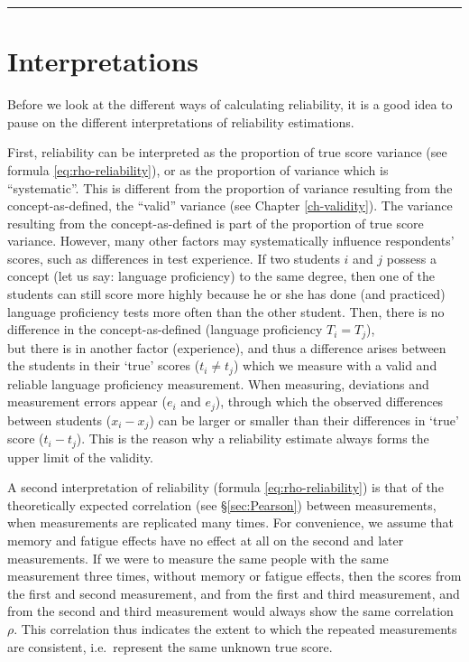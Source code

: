 \documentclass[
]{book}
\begin{document}
\begin{center}\rule{0.5\linewidth}{0.5pt}\end{center}

\hypertarget{interpretations}{%
\section{Interpretations}\label{interpretations}}

Before we look at the different ways of calculating
reliability, it is a good idea to pause on the different
interpretations of reliability estimations.

First, reliability can be interpreted as the proportion of
true score variance (see formula \eqref{eq:rho-reliability}), or
as the proportion of variance which is ``systematic''.
This is different from the proportion of variance resulting from the concept-as-defined,
the ``valid'' variance (see Chapter \ref{ch-validity}).
The variance resulting from the concept-as-defined is part of the proportion of
true score variance.
However, many other factors may systematically influence
respondents' scores, such as differences in test experience. If two students \(i\) and \(j\)
possess a concept (let us say: language proficiency) to the same degree, then one of the
students can still score more highly because he or she has done (and practiced) language proficiency
tests more often than the other student. Then, there is no difference
in the concept-as-defined (language proficiency \(T_i = T_j\)),\\
but there is in another factor (experience), and thus a difference arises
between the students in their `true' scores (\(t_i \neq t_j\)) which
we measure with a valid and reliable language proficiency measurement. When measuring,
deviations and measurement errors appear (\(e_i\) and \(e_j\)), through which
the observed differences between students (\(x_i-x_j\)) can be larger or smaller than their
differences in `true' score (\(t_i-t_j\)).
This is the reason why a reliability estimate always forms the upper limit of
the validity.

A second interpretation of reliability (formula \eqref{eq:rho-reliability})
is that of the theoretically expected correlation (see
§\ref{sec:Pearson}) between measurements, when measurements are replicated
many times. For convenience, we assume that memory and fatigue
effects have no effect at all on the second and later measurements. If we were to
measure the same people with the same measurement
three times, without memory or fatigue effects, then the scores from the first and
second measurement, and from the first and third measurement, and from
the second and third measurement would always show the same correlation
\(\rho\). This correlation thus indicates the extent to which the repeated measurements
are consistent, i.e.~represent the same unknown true score.
\end{document}
